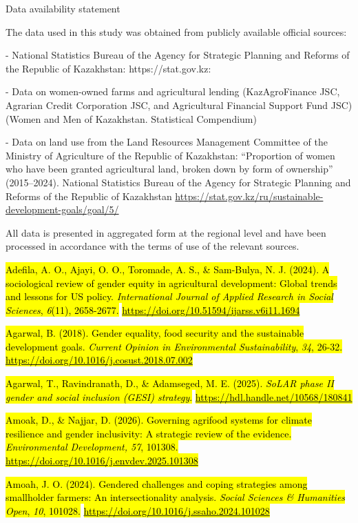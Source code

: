 \documentclass[
]{article}
\begin{document}
Data availability statement

The data used in this study was obtained from publicly available
official sources:

- National Statistics Bureau of the Agency for Strategic Planning and
Reforms of the Republic of Kazakhstan: https://stat.gov.kz:

- Data on women-owned farms and agricultural lending (KazAgroFinance
JSC, Agrarian Credit Corporation JSC, and Agricultural Financial Support
Fund JSC) (Women and Men of Kazakhstan. Statistical Compendium)

- Data on land use from the Land Resources Management Committee of the
Ministry of Agriculture of the Republic of Kazakhstan: ``Proportion of
women who have been granted agricultural land, broken down by form of
ownership'' (2015--2024). National Statistics Bureau of the Agency for
Strategic Planning and Reforms of the Republic of Kazakhstan
\url{https://stat.gov.kz/ru/sustainable-development-goals/goal/5/}

All data is presented in aggregated form at the regional level and have
been processed in accordance with the terms of use of the relevant
sources.

\hl{Adefila, A. O., Ajayi, O. O., Toromade, A. S., \& Sam-Bulya, N. J.
(2024). A sociological review of gender equity in agricultural
development: Global trends and lessons for US policy.
\emph{International Journal of Applied Research in Social Sciences},
\emph{6}(11), 2658-2677.}
\href{https://doi.org/10.51594/ijarss.v6i11.1694}{\hl{https://doi.org/10.51594/ijarss.v6i11.1694}}

\hl{Agarwal, B. (2018). Gender equality, food security and the
sustainable development goals. \emph{Current Opinion in Environmental
Sustainability}, \emph{34}, 26-32.}
\href{https://doi.org/10.1016/j.cosust.2018.07.002}{\hl{https://doi.org/10.1016/j.cosust.2018.07.002}}

\hl{Agarwal, T., Ravindranath, D., \& Adamseged, M. E. (2025).
\emph{SoLAR phase II gender and social inclusion (GESI) strategy}.}
\href{https://hdl.handle.net/10568/180841}{\hl{https://hdl.handle.net/10568/180841}}

\hl{Amoak, D., \& Najjar, D. (2026). Governing agrifood systems for
climate resilience and gender inclusivity: A strategic review of the
evidence. \emph{Environmental Development, 57}, 101308.}
\href{https://doi.org/10.1016/j.envdev.2025.101308}{\hl{https://doi.org/10.1016/j.envdev.2025.101308}}

\hl{Amoah, J. O. (2024). Gendered challenges and coping strategies among
smallholder farmers: An intersectionality analysis. \emph{Social
Sciences \& Humanities Open}, \emph{10}, 101028.}
\href{https://doi.org/10.1016/j.ssaho.2024.101028}{\hl{https://doi.org/10.1016/j.ssaho.2024.101028}}
\end{document}
